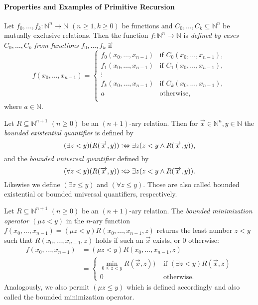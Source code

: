 \paragraph{Properties and Examples of Primitive Recursion}
Let $f_0, \ldots, f_k : \mathbb{N}^n \rightarrow \mathbb{N}$ $(n \ge 1,k \ge 0)$ be functions and $C_0, \ldots, C_k \subseteq  \mathbb{N}^n $ be mutually exclusive relations. Then the function $f: \mathbb{N}^n \rightarrow \mathbb{N}$ is \textit{defined by cases $C_0, \ldots, C_k$ from functions $f_0, \ldots, f_k$} if  
\[ f(x_0, \ldots, x_{n-1}) =\begin{cases} 
      f_0(x_0, \ldots, x_{n-1}) & \text{if }C_0(x_0, \ldots, x_{n-1}), \\
      f_1(x_0, \ldots, x_{n-1}) & \text{if }C_1(x_0, \ldots, x_{n-1}), \\
      \vdots \\
      f_k(x_0, \ldots, x_{n-1}) & \text{if }C_k(x_0, \ldots, x_{n-1}), \\
      a & \text{otherwise}, \\
   \end{cases}
\] where $a \in \mathbb{N}$.


Let $R\subseteq \mathbb{N}^{n+1}$ $(n \ge 0)$ be an $(n+1)$-ary relation. Then for $\overrightarrow{x} \in \mathbb{N}^n, y \in \mathbb{N}$ the \textit{bounded existential quantifier} is defined by
\[ (\exists z < y) (R(\overrightarrow{x},y)) \vcentcolon \Leftrightarrow \exists z (z <y \wedge R(\overrightarrow{x},y)), \]
and the \textit{bounded universal quantifier} defined by 
\[ (\forall z < y) (R(\overrightarrow{x},y)) \vcentcolon \Leftrightarrow \exists z (z <y \wedge R(\overrightarrow{x},y)). \]
Likewise we define $(\exists z \le y)$ and $(\forall z \le y)$. Those are also called bounded existential or bounded universal quantifiers, respectively. 


Let $R\subseteq \mathbb{N}^{n+1}$ $(n \ge 0)$ be an $(n+1)$-ary relation. The \textit{bounded minimization operator $(\mu z  < y)$} in the $n$-ary function $f(x_0, \ldots, x_{n-1}) = (\mu z < y) R(x_0, \ldots, x_{n-1},z)$ returns the least number $z < y$ such that $R(x_0, \ldots, x_{n-1},z)$ holds if such an $\overrightarrow{x}$ exists, or $0$ otherwise:
\begin{align*}
f(x_0, \ldots, x_{n-1}) & = (\mu z < y) R(x_0, \ldots, x_{n-1},z)\\
& = \begin{cases} \min_{0 \le z < y }R(\overrightarrow{x},z)) &\text{ if } (\exists z < y) R(\overrightarrow{x},z) \\
0 &\text{ otherwise.}\end{cases}  
\end{align*}
Analogously, we also permit $(\mu z \le y)$ which is defined accordingly and also called the bounded minimization operator.

